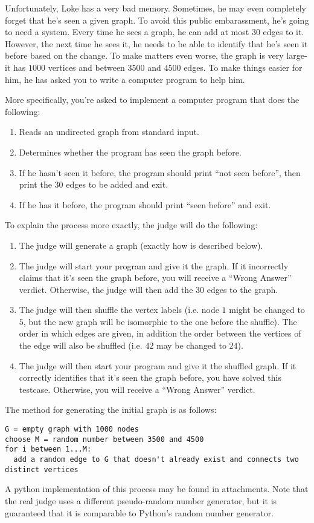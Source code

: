 \noindent
Unfortunately, Loke has a very bad memory. Sometimes, he may even completely forget that he's seen a given graph. 
To avoid this public embarassment, he's going to need a system. Every time he sees a graph, he can add at most $30$
edges to it. However, the next time he sees it, he needs to be able to identify that he's seen it before based on the
change. To make matters even worse, the graph is very large- it has $1000$ vertices and between $3500$ and $4500$ edges.
To make things easier for him, he has asked you to write a computer program to help him.

More specifically, you're asked to implement a computer program that does the following:
\begin{enumerate}
  \item Reads an undirected graph from standard input.
  \item Determines whether the program has seen the graph before.
  \item If he hasn't seen it before, the program should print ``not seen before'', then print the $30$ edges to be added and exit.
  \item If he has it before, the program should print ``seen before'' and exit.
\end{enumerate}
To explain the process more exactly, the judge will do the following:
\begin{enumerate}
  \item The judge will generate a graph (exactly how is described below).
  \item The judge will start your program and give it the graph. If it incorrectly claims that it's seen the graph before,
  you will receive a ``Wrong Answer'' verdict. Otherwise, the judge will then add the $30$ edges to the graph.
  \item The judge will then shuffle the vertex labels (i.e. node $1$ might be changed to $5$, but the new
  graph will be isomorphic to the one before the shuffle). The order in which edges are given, in addition the
  order between the vertices of the edge will also be shuffled (i.e. $4 2$ may be changed to $2 4$).
  \item The judge will then start your program and give it the shuffled graph. If it correctly identifies that
  it's seen the graph before, you have solved this testcase. Otherwise, you will receive a ``Wrong Answer'' verdict.
\end{enumerate}


The method for generating the initial graph is as follows:
\begin{verbatim}
G = empty graph with 1000 nodes
choose M = random number between 3500 and 4500
for i between 1...M:
  add a random edge to G that doesn't already exist and connects two distinct vertices
\end{verbatim}
A python implementation of this process may be found in attachments. Note that the real judge uses a different pseudo-random
number generator, but it is guaranteed that it is comparable to Python's random number generator.


